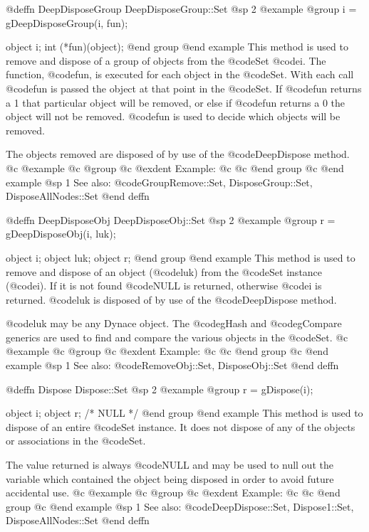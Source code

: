 @deffn {DeepDisposeGroup} DeepDisposeGroup::Set
@sp 2
@example
@group
i = gDeepDisposeGroup(i, fun);

object  i;
int     (*fun)(object);
@end group
@end example
This method is used to remove and dispose of a group of objects from the
@code{Set} @code{i}.  The function, @code{fun}, is executed for each object in
the @code{Set}.  With each call @code{fun} is passed the object at that point
in the @code{Set}.  If @code{fun} returns a 1 that particular object will be
removed, or else if @code{fun} returns a 0 the object will not be
removed.  @code{fun} is used to decide which objects will be removed.

The objects removed are disposed of by use of the @code{DeepDispose} method.
@c @example
@c @group
@c @exdent Example:
@c 
@c @end group
@c @end example
@sp 1
See also:  @code{GroupRemove::Set, DisposeGroup::Set, DisposeAllNodes::Set}
@end deffn











@deffn {DeepDisposeObj} DeepDisposeObj::Set
@sp 2
@example
@group
r = gDeepDisposeObj(i, luk);

object  i;
object  luk;
object  r;
@end group
@end example
This method is used to remove and dispose of an object (@code{luk}) from
the @code{Set} instance (@code{i}).  If it is not found @code{NULL} is returned,
otherwise @code{i} is returned.  @code{luk} is disposed of by use of the
@code{DeepDispose} method.

@code{luk} may be any Dynace object.  The @code{gHash} and
@code{gCompare} generics are used to find and compare the various
objects in the @code{Set}.
@c @example
@c @group
@c @exdent Example:
@c 
@c @end group
@c @end example
@sp 1
See also:  @code{RemoveObj::Set, DisposeObj::Set}
@end deffn











@deffn {Dispose} Dispose::Set
@sp 2
@example
@group
r = gDispose(i);

object  i;
object  r;     /*  NULL  */
@end group
@end example
This method is used to dispose of an entire @code{Set} instance.
It does not dispose of any of the objects or associations in the @code{Set}.

The value returned is always @code{NULL} and may be used to null out
the variable which contained the object being disposed in order to
avoid future accidental use.
@c @example
@c @group
@c @exdent Example:
@c 
@c @end group
@c @end example
@sp 1
See also:  @code{DeepDispose::Set, Dispose1::Set, DisposeAllNodes::Set}
@end deffn










